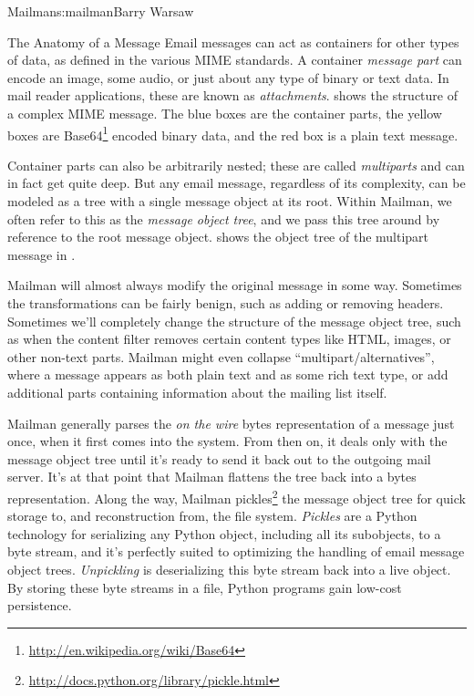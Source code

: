 \begin{aosachapter}{Mailman}{s:mailman}{Barry Warsaw}
\begin{aosasect1}{The Anatomy of a Message}
Email messages can act as containers for other types of data, as
defined in the various MIME standards.  A container \emph{message
  part} can encode an image, some audio, or just about any type of
binary or text data.  In mail reader applications, these are known as
\emph{attachments}.   shows the structure
of a complex MIME message.  The blue boxes are the container parts,
the yellow boxes are
Base64\footnote{\url{http://en.wikipedia.org/wiki/Base64}} encoded
binary data, and the red box is a plain text message.


Container parts can also be arbitrarily nested; these are called
\emph{multiparts} and can in fact get quite deep.  But any email
message, regardless of its complexity, can be modeled as a tree with
a single message object at its root.  Within Mailman, we often refer
to this as the \emph{message object tree}, and we pass this tree
around by reference to the root message object.
 shows the object tree of the
multipart message in .


Mailman will almost always modify the original message in some way.
Sometimes the transformations can be fairly benign, such as adding or
removing headers.  Sometimes we'll completely change the structure of
the message object tree, such as when the content filter removes
certain content types like HTML, images, or other non-text parts.
Mailman might even collapse ``multipart/alternatives'', where a message
appears as both plain text and as some rich text type, or add
additional parts containing information about the mailing list itself.

Mailman generally parses the \emph{on the wire} bytes representation
of a message just once, when it first comes into the system.  From
then on, it deals only with the message object tree until it's ready
to send it back out to the outgoing mail server.  It's at that point
that Mailman flattens the tree back into a bytes representation.
Along the way, Mailman
pickles\footnote{\url{http://docs.python.org/library/pickle.html}} the
message object tree for quick storage to, and reconstruction from, the
file system.  \emph{Pickles} are a Python technology for serializing
any Python object, including all its subobjects, to a byte stream, and
it's perfectly suited to optimizing the handling of email message
object trees. \emph{Unpickling} is deserializing this byte stream back
into a live object.  By storing these byte streams in a file, Python
programs gain low-cost persistence.


\end{aosasect1}
\end{aosachapter}
